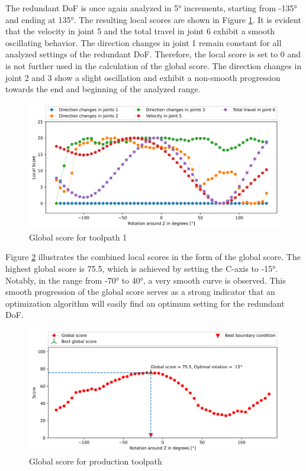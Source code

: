 The redundant \acrshort{DoF} is once again analyzed in 5° increments, starting from -135° and ending at 135°. The resulting local scores are shown in Figure \ref{LS4}. It is evident that the velocity in joint 5 and the total travel in joint 6 exhibit a smooth oscillating behavior. The direction changes in joint 1 remain constant for all analyzed settings of the redundant \acrshort{DoF}. Therefore, the local score is set to 0 and is not further used in the calculation of the global score. The direction changes in joint 2 and 3 show a slight oscillation and exhibit a non-smooth progression towards the end and beginning of the analyzed range.

\begin{figure}[H]
	\centerline{\includegraphics[width=1\textwidth]{figures/LocalScores_4.png}}
	\caption{Global score for toolpath 1}
	\label{LS4}
\end{figure}

Figure \ref{GS4} illustrates the combined local scores in the form of the global score. The highest global score is 75.5, which is achieved by setting the C-axis to -15°. Notably, in the range from -70° to 40°, a very smooth curve is observed. This smooth progression of the global score serves as a strong indicator that an optimization algorithm will easily find an optimum setting for the redundant \acrshort{DoF}.

\begin{figure}[H]
	\centerline{\includegraphics[width=1\textwidth]{figures/best_c_4.png}}
	\caption{Global score for production toolpath}
	\label{GS4}
\end{figure}


